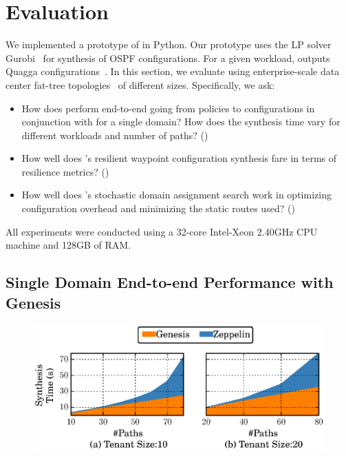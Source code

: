 \section{Evaluation}
 \label{sec:evaluation}
 
 We implemented a prototype of \name in Python. Our prototype uses the
 LP solver Gurobi~\cite{gurobi} for synthesis of OSPF configurations.
 For a given workload, \name outputs Quagga configurations~\cite{quagga}.  In this section, we evaluate \Name using
enterprise-scale data
center fat-tree topologies~\cite{fattree} of different 
sizes. 
Specifically, we ask:
\begin{itemize}
	\item How does \name perform end-to-end going from policies to
	configurations in conjunction with \genesis for a single domain? 
	How does the synthesis time vary for different workloads and number 
	of paths? ()
	
	\item How well does \name's resilient waypoint configuration 
	synthesis fare in terms of resilience metrics? ()
	
	\item How well does \name's stochastic domain assignment 
	search work in optimizing configuration overhead
	and minimizing the static routes used? ()
\end{itemize}
All experiments were conducted using a
32-core Intel-Xeon 2.40GHz CPU machine and
128GB of RAM.

\subsection{Single Domain End-to-end Performance with Genesis}\label{sec:ospfeval}

\begin{figure}
	\includegraphics[width=0.58\columnwidth]{figures/ospfisolation.eps}
	\vspace{-8pt}
\end{figure}

